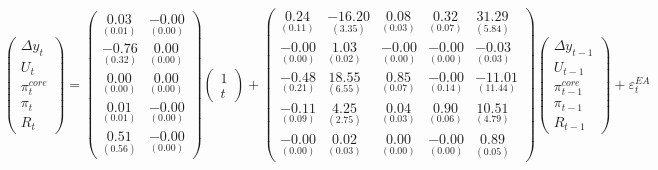 \documentclass[
  10pt,
]{article}
\begin{document}
\begin{equation}
\begin{pmatrix}
 \Delta y_{t} \\
U_{t} \\
\pi^{core}_{t} \\
\pi_{t} \\
R_{t} 
\end{pmatrix} = \begin{pmatrix}
 \underset{(0.01)}{0.03} & \underset{(0.00)}{-0.00} \\
\underset{(0.32)}{-0.76} & \underset{(0.00)}{0.00} \\
\underset{(0.00)}{0.00} & \underset{(0.00)}{0.00} \\
\underset{(0.01)}{0.01} & \underset{(0.00)}{-0.00} \\
\underset{(0.56)}{0.51} & \underset{(0.00)}{-0.00} 
\end{pmatrix} \begin{pmatrix} 1 \\ t \end{pmatrix}+\begin{pmatrix}
 \underset{(0.11)}{0.24} & \underset{(3.35)}{-16.20} & \underset{(0.03)}{0.08} & \underset{(0.07)}{0.32} & \underset{(5.84)}{31.29} \\
\underset{(0.00)}{-0.00} & \underset{(0.02)}{1.03} & \underset{(0.00)}{-0.00} & \underset{(0.00)}{-0.00} & \underset{(0.03)}{-0.03} \\
\underset{(0.21)}{-0.48} & \underset{(6.55)}{18.55} & \underset{(0.07)}{0.85} & \underset{(0.14)}{-0.00} & \underset{(11.44)}{-11.01} \\
\underset{(0.09)}{-0.11} & \underset{(2.75)}{4.25} & \underset{(0.03)}{0.04} & \underset{(0.06)}{0.90} & \underset{(4.79)}{10.51} \\
\underset{(0.00)}{-0.00} & \underset{(0.03)}{0.02} & \underset{(0.00)}{0.00} & \underset{(0.00)}{-0.00} & \underset{(0.05)}{0.89} 
\end{pmatrix} \begin{pmatrix}
 \Delta y_{t - 1} \\
U_{t - 1} \\
\pi^{core}_{t - 1} \\
\pi_{t - 1} \\
R_{t - 1} 
\end{pmatrix}+ \varepsilon^{EA}_t
\label{eq:var-ea}
\end{equation}
\end{document}
